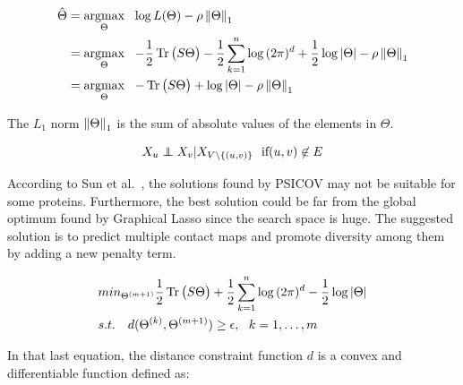         \begin{equation}
            \begin{split}
                \hat{\Theta} & = \argmax_{\Theta} \ \ \log{L}(\Theta) - \rho \norm{\Theta}_1 \\
                & = \argmax_{\Theta} \ \ -\frac{1}{2} \trace\big(S \Theta\big) - \frac{1}{2} \sum\limits_{k=1}^{n} 
                    \log{(2\pi)^d} + \frac{1}{2} \log{\vert\Theta\vert} - \rho \norm{\Theta}_1 \\
                & = \argmax_{\Theta} \ \ -\trace\big(S \Theta\big) + \log{\vert\Theta\vert} - \rho \norm{\Theta}_1 \\
            \end{split}
        \end{equation}

        The $L_1$ norm $\left\lVert\Theta\right\rVert_1$ is the sum of absolute values of the elements in $\Theta$.
        \todo{}

        \begin{equation}
            X_u \independent X_v \vert X_{V \setminus \{(u,v)\}} \ \ \text{if} (u, v) \not\in E
        \end{equation}
        \todo{}



        According to Sun et al.~\cite{doi:10.1093/nar/gky995}, the solutions found by PSICOV may not be suitable for some proteins.
        Furthermore, the best solution could be far from the global optimum found by Graphical Lasso since the search space is huge.
        The suggested solution is to predict multiple contact maps and promote diversity among them by adding a new penalty term.

        \begin{equation}\label{mbest}
            \begin{split}
                & min_{\Theta^{(m+1)}} \frac{1}{2} \operatorname{Tr}\big(S \Theta\big) + \frac{1}{2} 
                    \sum\limits_{k=1}^{n} \log{(2\pi)^d} - \frac{1}{2} \log{\vert\Theta\vert} \\
                & s.t. \ \ \ d(\Theta^{(k)}, \Theta^{(m+1)}) \ge \epsilon, \ \ k = 1, \dotsc, m
            \end{split}
        \end{equation}

        In that last equation, the distance constraint function $d$ is a convex and differentiable function defined as:

